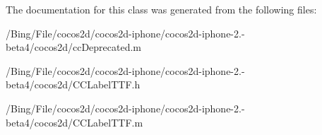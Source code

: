 The documentation for this class was generated from the following files\-:\begin{DoxyCompactItemize}
\item 
/\-Bing/\-File/cocos2d/cocos2d-\/iphone/cocos2d-\/iphone-\/2.-\/beta4/cocos2d/cc\-Deprecated.\-m\item 
/\-Bing/\-File/cocos2d/cocos2d-\/iphone/cocos2d-\/iphone-\/2.-\/beta4/cocos2d/C\-C\-Label\-T\-T\-F.\-h\item 
/\-Bing/\-File/cocos2d/cocos2d-\/iphone/cocos2d-\/iphone-\/2.-\/beta4/cocos2d/C\-C\-Label\-T\-T\-F.\-m\end{DoxyCompactItemize}
